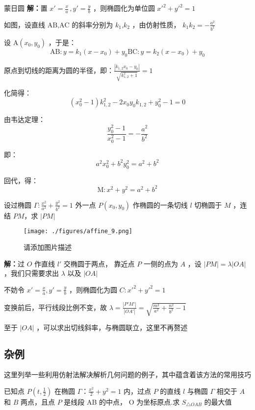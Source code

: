 \begin{corollary}{}
\begin{corollary}{蒙日圆}
\textbf{解：}置 $\displaystyle{x'=\frac{x}{a}\,,y'=\frac{y}b}$ ，则椭圆化为单位圆 $\displaystyle{x'^2+y'^2=1}$ 

如图，设直线 $\displaystyle{\text{AB}}$,$\displaystyle{\text{AC}}$ 的斜率分别为 $\displaystyle{k_1}$,$\displaystyle{k_2}$ ，由仿射性质， $\displaystyle{k_1k_2=-\frac{a^2}{b^2}}$ 

设 $\displaystyle{\text{A}(x_0,y_0)}$ ，于是： 
$$\text{AB}:y=k_1(x-x_0)+y_0\text{BC}:y=k_2(x-x_0)+y_0 $$

原点到切线的距离为圆的半径，即：$\displaystyle{\frac{|k_{1,2}x_0-y_0|}{\sqrt{k_{1,2}^2+1}}=1}$

化简得：
$$(x_0^2-1)k_{1,2}^2-2x_0y_0k_{1,2}+y_0^2-1=0$$

由韦达定理：
$$\frac{y_0^2-1}{x_0^2-1}=-\frac{a^2}{b^2}$$

即：
$$a^2x_0^2+b^2y_0^2=a^2+b^2$$

回代，得：
$$\text{M}:x^2+y^2=a^2+b^2$$
\end{corollary}
\begin{corollary}{}
设过椭圆 $\displaystyle{\Gamma:\frac{x^2}{a^2}+\frac{y^2}{b^2}=1}$ 外一点 $\displaystyle{P(x_0,y_0)}$ 作椭圆的一条切线 $\displaystyle{l}$ 切椭圆于 $\displaystyle{M}$ ，连结 $\displaystyle{PM}$，求 $\displaystyle{|PM|}$
\begin{figure}[ht]
\centering
\texttt{[image: ./figures/affine\_9.png]}
\caption{请添加图片描述} \label{affine_fig9}
\end{figure}
\textbf{解：}过 $\displaystyle{O}$ 作直线 $\displaystyle{l'}$ 交椭圆于两点， 靠近点 $\displaystyle{P}$ 一侧的点为 $\displaystyle{A}$ ，设 $\displaystyle{|PM|=\lambda|OA|}$ ，我们只需要求出 $\displaystyle{\lambda}$ 以及 $\displaystyle{|OA|}$ 

不妨令 $\displaystyle{x'=\frac{x}{a},y'=\frac{y}{b}}$ ，则椭圆化为圆 $\displaystyle{C:x'^2+y'^2=1}$

变换前后，平行线段比例不变，故 $\displaystyle{\lambda=\frac{|P'M'|}{|OA'|}=\sqrt{\frac{m^2}{a^2}+\frac{n^2}{b^2}-1}}$ 

至于 $\displaystyle{|OA|}$ ，可以求出切线斜率，与椭圆联立，这里不再赘述
\end{corollary}

\subsection{杂例}
这里列举一些利用仿射法解决解析几何问题的例子，其中蕴含着该方法的常用技巧
\begin{example}{}
已知点 $\displaystyle{P\left(t,\frac{1}{2}\right)}$ 在椭圆 $\displaystyle{\Gamma：\frac{x^2}{2}+y^2=1}$ 内，过点 $\displaystyle{P}$ 的直线 $\displaystyle{l}$ 与椭圆 $\displaystyle{\Gamma}$ 相交于 $\displaystyle{A}$ 和 $\displaystyle{B}$ 两点，且点 $\displaystyle{P}$ 是线段 AB 的中点， O 为坐标原点.求 $\displaystyle{S_{\triangle OAB}}$ 的最大值


\end{example}
\end{corollary}
